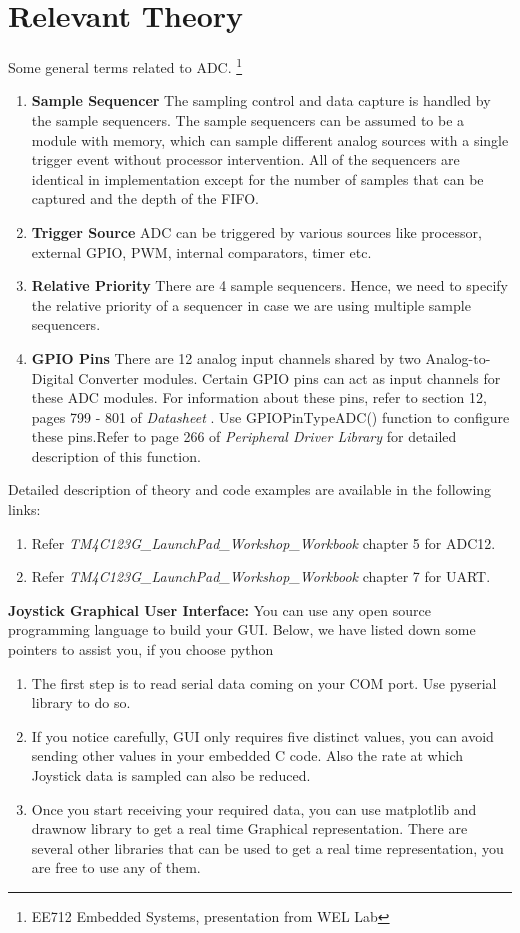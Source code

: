 \documentclass[a4paper,12pt,oneside]{book}
\begin{document}
\section {Relevant Theory}
Some general terms related to ADC.
\footnote{EE712 Embedded Systems, presentation from WEL Lab}
\begin{enumerate}
\item \textbf{Sample Sequencer}
The sampling control and data capture is handled by the sample sequencers.
The sample sequencers can be assumed to be a module with memory, which can sample different analog sources with a single trigger event without processor intervention.
All of the sequencers are identical in implementation except for the number of samples that can be captured and the depth of the FIFO.
\item \textbf{Trigger Source}
ADC can be triggered by various sources like processor, external GPIO, PWM, internal comparators, timer etc.
\item \textbf{Relative Priority}
There are 4 sample sequencers. Hence, we need to specify the relative priority of a sequencer in case we are using multiple sample sequencers.
\item \textbf{GPIO Pins}
There are 12 analog input channels shared by two Analog-to-Digital Converter modules. Certain GPIO pins can act as input channels for these ADC modules. For information about these pins, refer to section 12, pages 799 - 801 of \textit{Datasheet} . Use GPIOPinTypeADC() function to configure these pins.Refer to page 266 of \textit{Peripheral Driver Library} for detailed description of this function.
\end{enumerate}
Detailed description of theory and code examples are available in the following links:
\begin{enumerate}
\item Refer \textit{TM4C123G\_LaunchPad\_Workshop\_Workbook} chapter 5 for ADC12.
\item Refer \textit{TM4C123G\_LaunchPad\_Workshop\_Workbook} chapter 7 for UART.
\end{enumerate}

\textbf{Joystick Graphical User Interface:}
\newline
You can use any open source programming language to build your GUI. Below, we have listed down some pointers to assist you, if you choose python
\begin{enumerate}
\item The first step is to read serial data coming on your COM port. Use pyserial library to do so.
\item If you notice carefully, GUI only requires five distinct values, you can avoid sending other values in your embedded C code. Also the rate at which Joystick data is sampled can also be reduced.
\item
Once you start receiving your required data, you can use matplotlib and drawnow library to get a real time Graphical representation. There are several other libraries that can be used to get a real time representation, you are free to use any of them. 
\end{enumerate}
\end{document}
